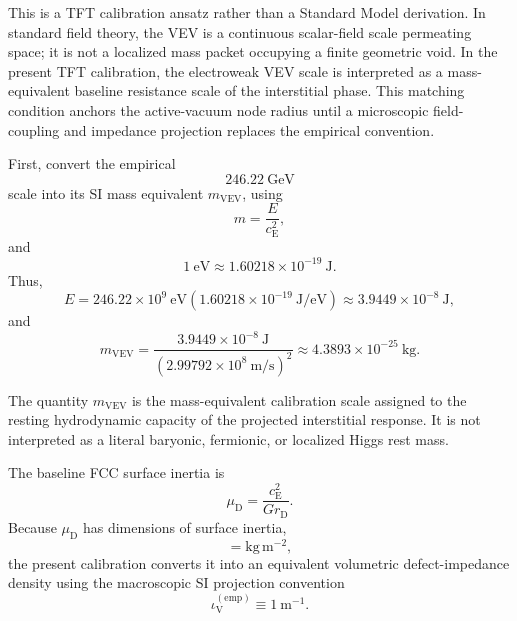 This is a TFT calibration ansatz rather than a Standard Model derivation. In
standard field theory, the VEV is a continuous scalar-field scale permeating
space; it is not a localized mass packet occupying a finite geometric void.
In the present TFT calibration, the electroweak VEV scale is interpreted as a
mass-equivalent baseline resistance scale of the interstitial phase. This
matching condition anchors the active-vacuum node radius until a microscopic
field-coupling and impedance projection replaces the empirical convention.

First, convert the empirical
\begin{equation}
    246.22~\mathrm{GeV}
\end{equation}
scale into its SI mass equivalent $m_{\mathrm{VEV}}$, using
\begin{equation}
    m
    =
    \frac{E}{c_{\mathrm E}^{2}},
\end{equation}
and
\begin{equation}
    1~\mathrm{eV}
    \approx
    1.60218\times10^{-19}~\mathrm J.
\end{equation}
Thus,
\begin{equation}
    E
    =
    246.22\times10^{9}~\mathrm{eV}
    \left(
        1.60218\times10^{-19}~\mathrm{J/eV}
    \right)
    \approx
    3.9449\times10^{-8}~\mathrm J,
\end{equation}
and
\begin{equation}
    m_{\mathrm{VEV}}
    =
    \frac{
        3.9449\times10^{-8}~\mathrm J
    }{
        \left(
            2.99792\times10^{8}~\mathrm{m/s}
        \right)^2
    }
    \approx
    4.3893\times10^{-25}~\mathrm{kg}.
\end{equation}

The quantity $m_{\mathrm{VEV}}$ is the mass-equivalent calibration scale
assigned to the resting hydrodynamic capacity of the projected interstitial
response. It is not interpreted as a literal baryonic, fermionic, or localized
Higgs rest mass.

The baseline FCC surface inertia is
\begin{equation}
    \mu_{\mathrm D}
    =
    \frac{
        c_{\mathrm E}^{2}
    }{
        Gr_{\mathrm D}
    }.
\end{equation}
Because $\mu_{\mathrm D}$ has dimensions of surface inertia,
\begin{equation}
    [\mu_{\mathrm D}]
    =
    \mathrm{kg\,m^{-2}},
\end{equation}
the present calibration converts it into an equivalent volumetric
defect-impedance density using the macroscopic SI projection convention
\begin{equation}
    \iota_{\mathrm V}^{(\mathrm{emp})}
    \equiv
    1~\mathrm{m^{-1}}.
\end{equation}

